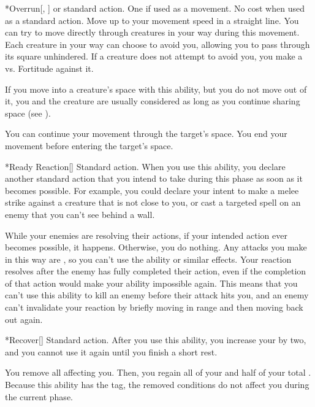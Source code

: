    \begin{activeability}*{Overrun}[, ]
      \abilityusagetime {} or standard action.
      \abilitycost One  if used as a movement. No cost when used as a standard action.
      \rankline
      Move up to your movement speed in a straight line.
      You can try to move directly through creatures in your way during this movement.
      Each creature in your way can choose to avoid you, allowing you to pass through its square unhindered.
      If a creature does not attempt to avoid you, you make a  vs. Fortitude against it.

      If you move into a creature's space with this ability, but you do not move out of it, you and the creature are usually considered \squeezing as long as you continue sharing space (see ).

      \hit You can continue your movement through the target's space.
      \miss You end your movement before entering the target's space.
    \end{activeability}

    \begin{activeability}*{Ready Reaction}[\atSwift]
      \abilityusagetime Standard action.
      \rankline
      When you use this ability, you declare another standard action that you intend to take during this phase as soon as it becomes possible.
      For example, you could declare your intent to make a melee strike against a creature that is not close to you, or cast a targeted spell on an enemy that you can't see behind a wall.

      While your enemies are resolving their actions, if your intended action ever becomes possible, it happens.
      Otherwise, you do nothing.
      Any attacks you make in this way are , so you can't use the  ability or similar effects.
      Your reaction resolves after the enemy has fully completed their action, even if the completion of that action would make your ability impossible again.
      This means that you can't use this ability to kill an enemy before their attack hits you, and an enemy can't invalidate your reaction by briefly moving in range and then moving back out again.
    \end{activeability}

    \begin{activeability}*{Recover}[]
      \abilityusagetime Standard action.
      \rankline
      After you use this ability, you increase your  by two, and you cannot use it again until you finish a short rest.

      You remove all  affecting you.
      Then, you regain all of your  and half of your total .
      Because this ability has the  tag, the removed conditions do not affect you during the current phase.
    \end{activeability}

